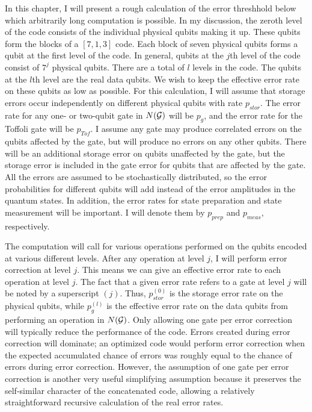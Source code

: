 \documentclass{report}
\newcommand{\G}{{\cal G}}
\begin{document}
In this chapter, I will present a rough calculation of the error threshhold 
below which arbitrarily long computation is possible.  In my discussion, 
the zeroth level of the code consists of the individual physical qubits making 
it up.  These qubits form the blocks of a $[7,1,3]$ code.  Each block of seven 
physical qubits forms a qubit at the first level of the code.  In general, 
qubits at the $j$th level of the code consist of $7^j$ physical qubits.  There 
are a total of $l$ levels in the code.  The qubits at the $l$th level are the 
real data qubits.  We wish to keep the effective error rate on these qubits as 
low as possible.  For this calculation, I will assume that storage errors occur 
independently on different physical qubits with rate $p_{stor}$.  The error 
rate for any one- or two-qubit gate in $N(\G)$ will be $p_g$, and the error 
rate for the Toffoli gate will be $p_{Tof}$.  I assume any gate may produce 
correlated errors on the qubits affected by the gate, but will produce no 
errors on any other qubits.  There will be an additional storage error on 
qubits unaffected by the gate, but the storage error is included in the gate 
error for qubits that are affected by the gate.  All the errors are assumed 
to be stochastically distributed, so the error probabilities for different 
qubits will add instead of the error amplitudes in the quantum states.  In 
addition, the error rates for state preparation and state measurement will 
be important.  I will denote them by $p_{prep}$ and $p_{meas}$, 
respectively.

The computation will call for various operations performed on the qubits 
encoded at various different levels.  After any operation at level $j$, I will 
perform error correction at level $j$.  This means we can give an effective 
error rate to each operation at level $j$.  The fact that a given error rate 
refers to a gate at level $j$ will be noted by a superscript $(j)$.  Thus, 
$p_{stor}^{(0)}$ is the storage error rate on the physical qubits, while 
$p_{g}^{(l)}$ is the effective error rate on the data qubits from performing 
an operation in $N(\G)$.  Only allowing one gate per error correction will 
typically reduce the performance of the code.  Errors created during error 
correction will dominate; an optimized code would perform error 
correction when the expected accumulated chance of errors was roughly 
equal to the chance of errors during error correction.  However, the 
assumption of one gate per error correction is another very useful simplifying 
assumption because it preserves the self-similar character of the 
concatenated code, allowing a relatively straightforward recursive 
calculation of the real error rates.
\end{document}
